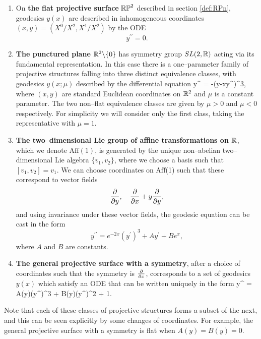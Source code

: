 \begin{enumerate}
\item On {\bf the flat projective surface} $\mathbb{RP}^2$ described in section \ref{def:RPn}, geodesics $y(x)$ are described in inhomogeneous coordinates $(x,y)=({X^0}/{X^2},{X^1}/{X^2})$ by the ODE
\[
y^{\prime\prime}=0.
\]
\item {\bf The punctured plane $\mathbb{R}^2\backslash\{0\}$} has symmetry group $SL(2,\mathbb{R})$ acting via its fundamental representation. In this case there is a one--parameter family of projective structures falling into three distinct equivalence classes, with geodesics $y(x;\mu)$ described by the differential equation
\be \label{eq:submaxODE}
y^{\prime\prime} = -\mu(y-xy^\prime)^3,
\ee
where $(x,y)$ are standard Euclidean coordinates on $\mathbb{R}^2$ and $\mu$ is a constant parameter. The two non--flat equivalence classes are given by $\mu>0$ and $\mu<0$ respectively. For simplicity we will consider only the first class, taking the representative with $\mu=1$.
\item {\bf The two--dimensional Lie group of affine transformations on $\mathbb{R}$}, which we denote $\mathrm{Aff}(1)$, is generated by the unique non--abelian two--dimensional Lie algebra $\{v_1,v_2\}$, where we choose a basis such that $[v_1,v_2]=v_1$. We can choose coordinates on $\mathrm{Aff}$(1) such that these correspond to vector fields
\[
\frac{\partial}{\partial y},\quad \frac{\partial}{\partial x} + y\frac{\partial}{\partial y},
\]
and using invariance under these vector fields, the geodesic equation can be cast in the form \cite{FLL}
\[
y^{\prime\prime} = e^{-2x}(y^\prime)^3 + Ay^\prime + Be^x,
\]
where $A$ and $B$ are constants.
\item {\bf The general projective surface with a symmetry}, after a choice of coordinates such that the symmetry is $\frac{\partial}{\partial x}$, corresponds to a set of geodesics $y(x)$ which satisfy an ODE that can be written uniquely in the form \cite{FLL}
\be \label{eq:1symode}
y^{\prime\prime} = A(y)(y^\prime)^3 + B(y)(y^\prime)^2 + 1.
\ee
\end{enumerate}

Note that each of these classes of projective structures forms a subset of the next, and this can be seen explicitly by some changes of coordinates. For example, the general projective surface with a symmetry is flat when $A(y)=B(y)=0$.


